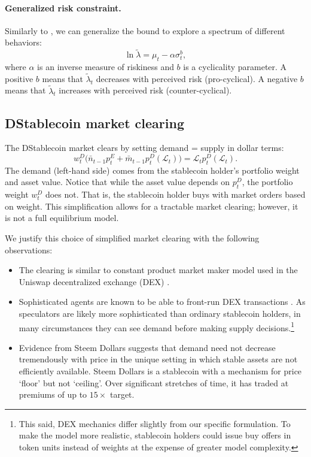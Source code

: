 \paragraph{Generalized risk constraint.}
Similarly to \cite{farmer2015}, we can generalize the bound to explore a spectrum of different behaviors:
$$\ln \tilde \lambda = \mu_t - \alpha \sigma_t^b,$$
where $\alpha$ is an inverse measure of riskiness and $b$ is a cyclicality parameter. A positive $b$ means that $\tilde \lambda_t$ decreases with perceived risk (pro-cyclical). A negative $b$ means that $\tilde \lambda_t$ increases with perceived risk (counter-cyclical). %




\subsection{DStablecoin market clearing}

The DStablecoin market clears by setting demand = supply in dollar terms:
$$w^D_t \Big(\bar n_{t-1}p^E_t + \bar m_{t-1}p^D_t(\mathcal{L}_t)\Big) = \mathcal{L}_t p^D_t(\mathcal{L}_t).$$
The demand (left-hand side) comes from the stablecoin holder's portfolio weight and asset value. Notice that while the asset value depends on $p_t^D$, the portfolio weight $w_t^D$ does not. That is, the stablecoin holder buys with market orders based on weight. This simplification allows for a tractable market clearing; however, it is not a full equilibrium model.

We justify this choice of simplified market clearing with the following observations:
\begin{itemize}
	\item The clearing is similar to constant product market maker model used in the Uniswap decentralized exchange (DEX) \cite{zhang2018}.
	\item Sophisticated agents are known to be able to front-run DEX transactions \cite{daian2019}. As speculators are likely more sophisticated than ordinary stablecoin holders, in many circumstances they can see demand before making supply decisions.\footnote{This said, DEX mechanics differ slightly from our specific formulation. To make the model more realistic, stablecoin holders could issue buy offers in token units instead of weights at the expense of greater model complexity.}
	\item Evidence from Steem Dollars suggests that demand need not decrease tremendously with price in the unique setting in which stable assets are not efficiently available. Steem Dollars is a stablecoin with a mechanism for price `floor' but not `ceiling'. Over significant stretches of time, it has traded at premiums of up to $15\times$ target.
\end{itemize}

